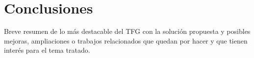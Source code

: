 \chapter{Conclusiones}
\label{cap:Conclusiones}

Breve resumen de lo más destacable del TFG con la solución propuesta y posibles mejoras, ampliaciones o trabajos relacionados que quedan por hacer y que tienen interés para el tema tratado.


